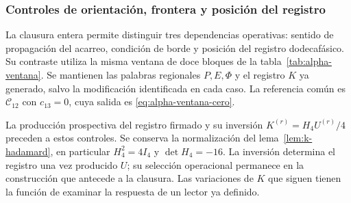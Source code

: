 \subsubsection{Controles de orientación, frontera y posición del registro}
\label{mg05:controles}

La clausura entera permite distinguir tres dependencias operativas:
sentido de propagación del acarreo, condición de borde y posición del
registro dodecafásico. Su contraste utiliza la misma ventana de doce
bloques de la tabla~\ref{tab:alpha-ventana}. Se mantienen las palabras
regionales \(P,E,\Phi\) y el registro \(K\) ya generado, salvo la
modificación identificada en cada caso. La referencia común es
\(\mathcal C_{12}\) con \(c_{13}=0\), cuya salida es
\eqref{eq:alpha-ventana-cero}.

La producción prospectiva del registro firmado y su inversión
\(K^{(r)}=H_4U^{(r)}/4\) preceden a estos controles. Se conserva la
normalización del lema~\ref{lem:k-hadamard}, en particular
\(H_4^2=4I_4\) y \(\det H_4=-16\). La inversión determina el
registro una vez producido \(U\); su selección operacional permanece
en la construcción que antecede a la clausura. Las variaciones de
\(K\) que siguen tienen la función de examinar la respuesta de un
lector ya definido.

